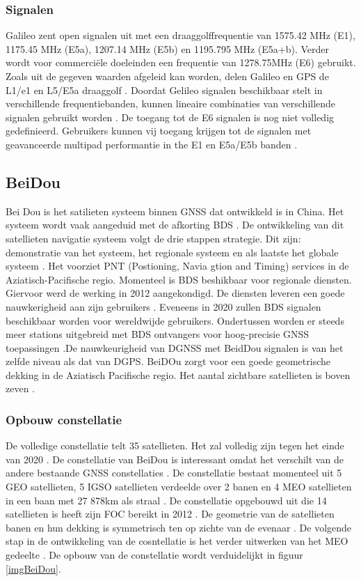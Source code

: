 \subsubsection{Signalen}
Galileo zent open signalen uit met een draaggolffrequentie van 1575.42 MHz (E1), 1175.45 MHz (E5a), 1207.14 MHz (E5b) en 1195.795 MHz (E5a+b). Verder wordt voor commerci\"ele doeleinden een frequentie van 1278.75MHz (E6) gebruikt. Zoals uit de gegeven waarden afgeleid kan worden, delen Galileo en GPS de  L1/e1 en L5/E5a draaggolf \cite{LBibPPP2}. Doordat Gelileo signalen beschikbaar stelt in verschillende frequentiebanden, kunnen lineaire combinaties van verschillende signalen gebruikt worden \cite{LBibGalileo3}. De toegang tot de E6 signalen is nog niet volledig gedefinieerd. Gebruikers kunnen vij toegang krijgen tot de signalen met geavanceerde multipad performantie in the E1 en E5a/E5b banden \cite{LBibGNSS9}. 

\subsection{BeiDou}
\label{LBeD}
Bei Dou is het satilieten systeem binnen GNSS dat ontwikkeld is in China. Het systeem wordt vaak  aangeduid met de afkorting BDS \cite{LBibBeiDou}. De ontwikkeling van dit satellieten navigatie systeem volgt de drie stappen strategie. Dit zijn: demonstratie van het systeem, het regionale systeem en als laatste het globale systeem \cite{LBibBeiDou4}. Het voorziet PNT (Postioning, Navia gtion and Timing) services in de Aziatisch-Pacifische regio. Momenteel is BDS  beshikbaar voor regionale diensten. Giervoor werd de werking in 2012 aangekondigd. De diensten leveren een goede nauwkerigheid aan zijn gebruikers \cite{LBibBeiDou, LBibGNSS9}. Eveneens in 2020 zullen BDS signalen beschikbaar worden voor wereldwijde gebruikers. Ondertussen worden er steeds meer stations uitgebreid met BDS ontvangers voor hoog-precisie GNSS toepassingen \cite{LBibBeiDou}.De nauwkeurigheid van DGNSS met BeidDou signalen is van het zelfde niveau als dat van DGPS. BeiDOu zorgt voor een goede geometrische dekking in de Aziatisch Pacifische regio. Het aantal zichtbare satellieten is boven zeven \cite{LBibBeiDou4}. 

\subsubsection{Opbouw constellatie}
De volledige constellatie telt 35 satellieten. Het zal volledig zijn tegen het einde van 2020 \cite{LBibGNSS4}. De constellatie van BeiDou is interessant omdat het verschilt van de andere bestaande GNSS constellaties \cite{LBibBeiDou3}.  De constellatie bestaat momenteel uit 5 GEO satellieten, 5 IGSO satellieten verdeelde over 2 banen en 4 MEO satellieten in een baan met 27 878km als straal \cite{LBibBeiDou2}. De constellatie opgebouwd uit die 14 satellieten is heeft zijn FOC bereikt in 2012 \cite{LBibBeiDou4}. De geometrie van de satellieten banen en hun dekking is symmetrisch ten op zichte van de evenaar \cite{LBibBeiDou5}.  De volgende stap in de ontwikkeling van de cosntellatie is het verder uitwerken van het MEO gedeelte \cite{LBibPPP2}. De opbouw van de constellatie wordt verduidelijkt in figuur \ref{imgBeiDou}.

